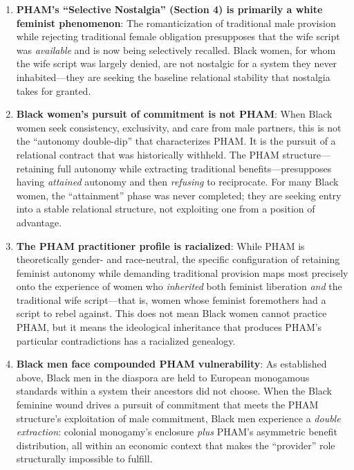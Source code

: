 \documentclass[12pt,openany]{book}
\numberwithin{equation}{chapter}
\begin{document}
\begin{enumerate}
    \item \textbf{PHAM's ``Selective Nostalgia'' (Section 4) is primarily a white feminist phenomenon}: The romanticization of traditional male provision while rejecting traditional female obligation presupposes that the wife script was \textit{available} and is now being selectively recalled. Black women, for whom the wife script was largely denied, are not nostalgic for a system they never inhabited---they are seeking the baseline relational stability that nostalgia takes for granted.
    
    \item \textbf{Black women's pursuit of commitment is not PHAM}: When Black women seek consistency, exclusivity, and care from male partners, this is not the ``autonomy double-dip'' that characterizes PHAM. It is the pursuit of a relational contract that was historically withheld. The PHAM structure---retaining full autonomy while extracting traditional benefits---presupposes having \textit{attained} autonomy and then \textit{refusing} to reciprocate. For many Black women, the ``attainment'' phase was never completed; they are seeking entry into a stable relational structure, not exploiting one from a position of advantage.
    
    \item \textbf{The PHAM practitioner profile is racialized}: While PHAM is theoretically gender- and race-neutral, the specific configuration of retaining feminist autonomy while demanding traditional provision maps most precisely onto the experience of women who \textit{inherited} both feminist liberation \textit{and} the traditional wife script---that is, women whose feminist foremothers had a script to rebel against. This does not mean Black women cannot practice PHAM, but it means the ideological inheritance that produces PHAM's particular contradictions has a racialized genealogy.
    
    \item \textbf{Black men face compounded PHAM vulnerability}: As established above, Black men in the diaspora are held to European monogamous standards within a system their ancestors did not choose. When the Black feminine wound drives a pursuit of commitment that meets the PHAM structure's exploitation of male commitment, Black men experience a \textit{double extraction}: colonial monogamy's enclosure \textit{plus} PHAM's asymmetric benefit distribution, all within an economic context that makes the ``provider'' role structurally impossible to fulfill.
\end{enumerate}
\end{document}
